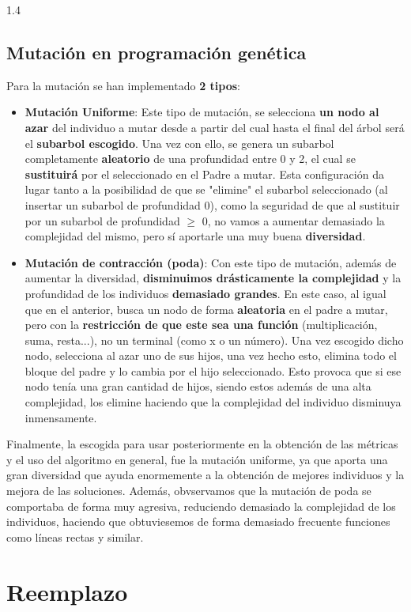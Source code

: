 \documentclass{article}
\begin{document}
\begin{spacing}{1.4}
\subsection{Mutación en programación genética}
Para la mutación se han implementado \textbf{2 tipos}:
\begin{itemize}
	\item \textbf{Mutación Uniforme}: Este tipo de mutación, se selecciona \textbf{un nodo al azar} del individuo a mutar desde a partir del cual hasta el final del árbol será el \textbf{subarbol escogido}. Una vez con ello, se genera un subarbol completamente \textbf{aleatorio} de una profundidad entre 0 y 2, el cual se \textbf{sustituirá} por el seleccionado en el Padre a mutar. Esta configuración
	da lugar tanto a la posibilidad de que se "elimine" el subarbol seleccionado (al insertar un subarbol de profundidad 0), como la seguridad de que al sustituir por un subarbol de profundidad $\geq$ 0, no vamos a aumentar demasiado la complejidad del mismo, pero sí aportarle una muy buena \textbf{diversidad}.
	\item \textbf{Mutación de contracción (poda)}: Con este tipo de mutación, además de aumentar la diversidad, \textbf{disminuimos drásticamente la complejidad} y la profundidad de los individuos \textbf{demasiado grandes}. En este caso, al igual que en el anterior, busca un nodo de forma \textbf{aleatoria} en el padre a mutar, pero con la \textbf{restricción de que este sea una función} (multiplicación, suma, resta...),
	no un terminal (como x o un número). Una vez escogido dicho nodo, selecciona al azar uno de sus hijos, una vez hecho esto, elimina todo el bloque del padre y lo cambia por el hijo seleccionado. Esto provoca que si ese nodo tenía una gran cantidad de hijos, siendo estos además de una alta complejidad, los elimine haciendo que la complejidad del individuo disminuya inmensamente.
\end{itemize}

Finalmente, la escogida para usar posteriormente en la obtención de las métricas y el uso del algoritmo en general, fue la mutación uniforme, ya que aporta una gran diversidad que ayuda enormemente a la obtención de mejores individuos y la mejora de las soluciones. Además, obvservamos que la mutación de poda
se comportaba de forma muy agresiva, reduciendo demasiado la complejidad de los individuos, haciendo que obtuviesemos de forma demasiado frecuente funciones como líneas rectas y similar.
\section{Reemplazo}

\end{spacing}
\end{document}
